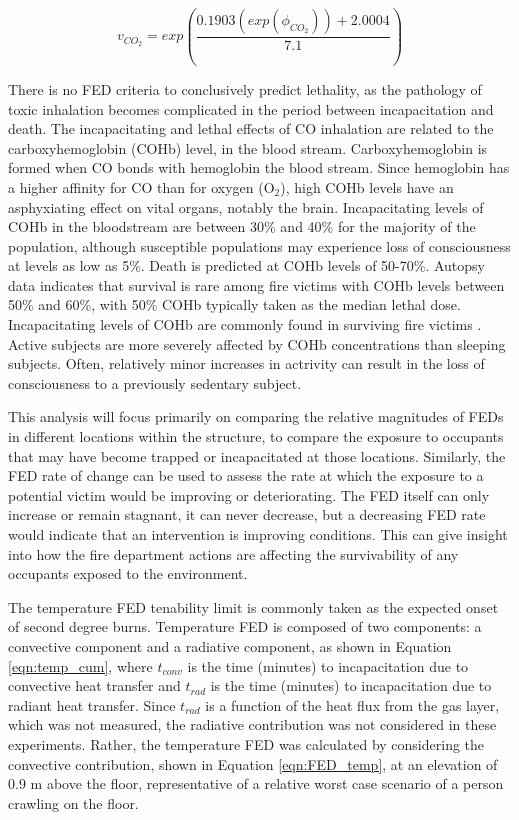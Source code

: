 \documentclass[12pt,oneside]{article}
\begin{document}
\begin{equation}\label{eqn:FED_vco2}v_{CO_2}=exp(\frac{0.1903 (exp(\phi_{CO_2}))+2.0004}{7.1})\end{equation}



There is no FED criteria to conclusively predict lethality, as the pathology of toxic inhalation becomes complicated in the period between incapacitation and death. The incapacitating and lethal effects of CO inhalation are related to the carboxyhemoglobin (COHb) level, in the blood stream. Carboxyhemoglobin is formed when CO bonds with hemoglobin the blood stream. Since hemoglobin has a higher affinity for CO than for oxygen (O$_2$), high COHb levels have an asphyxiating effect on vital organs, notably the brain. Incapacitating levels of COHb in the bloodstream are between 30\% and 40\% for the majority of the population, although susceptible populations may experience loss of consciousness at levels as low as 5\%. Death is predicted at COHb levels of 50-70\%. Autopsy data indicates that survival is rare among fire victims with COHb levels between 50\% and 60\%, with 50\% COHb typically taken as the median lethal dose. Incapacitating levels of COHb are commonly found in surviving fire victims \cite{SFPE:Purser}. Active subjects are more severely affected by COHb concentrations than sleeping subjects. Often, relatively minor increases in actrivity can result in the loss of consciousness to a previously sedentary subject. 

This analysis will focus primarily on comparing the relative magnitudes of FEDs in different locations within the structure, to compare the exposure to occupants that may have become trapped or incapacitated at those locations. Similarly, the FED rate of change can be used to assess the rate at which the exposure to a potential victim would be improving or deteriorating. The FED itself can only increase or remain stagnant, it can never decrease, but a decreasing FED rate would indicate that an intervention is improving conditions. This can give insight into how the fire department actions are affecting the survivability of any occupants exposed to the environment.

The temperature FED tenability limit is commonly taken as the expected onset of second degree burns. Temperature FED is composed of two components: a convective component and a radiative component, as shown in Equation \ref{eqn:temp_cum}, where $t_{conv}$ is the time (minutes) to incapacitation due to convective heat transfer and $t_{rad}$ is the time (minutes) to incapacitation due to radiant heat transfer. Since $t_{rad}$ is a function of the heat flux from the gas layer, which was not measured, the radiative contribution was not considered in these experiments. Rather, the temperature FED was calculated by considering the convective contribution, shown in Equation \ref{eqn:FED_temp}, at an elevation of 0.9 m above the floor, representative of a relative worst case scenario of a person crawling on the floor. 
\end{document}
